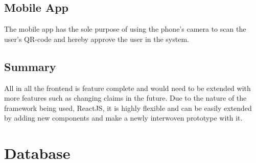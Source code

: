 \subsection{Mobile App}

The mobile app has the sole purpose of using the phone's camera to scan the user's QR-code and hereby approve the user in
the system.

\subsection{Summary}
\label{sec:frontendSummary}

All in all the frontend is feature complete and would need to be extended with more features such as changing claims in
the future. Due to the nature of the framework being used, ReactJS, it is highly flexible and can be easily extended by
adding new components and make a newly interwoven prototype with it.


\section{Database}
\label{sec:database}

